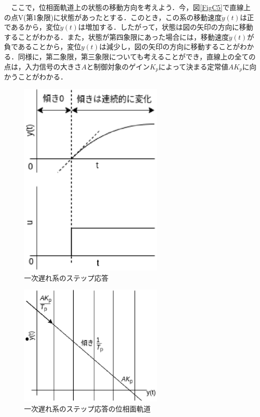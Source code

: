 \documentclass[12pt]{jsarticle}
\begin{document}
　ここで，位相面軌道上の状態の移動方向を考えよう．今，図\ref{FigC5}で直線上の点V(第1象限)に状態があったとする．このとき，この系の移動速度$\dot{y}(t)$は正であるから，変位$\dot{y}(t)$は増加する．したがって，状態は図の矢印の方向に移動することがわかる．また，状態が第四象限にあった場合には，移動速度$\dot{y}(t)$が負であることから，変位$y(t)$は減少し，図の矢印の方向に移動することがわかる．同様に，第二象限，第三象限についても考えることができ，直線上の全ての点は，入力信号の大きさ$A$と制御対象のゲイン$K_p$によって決まる定常値$AK_p$に向かうことがわかる．\\
\begin{figure}[tb]
  \begin{center}
    \includegraphics[clip,width=7.0cm]{../Img/FigC6.eps}
    \caption{一次遅れ系のステップ応答}
    \label{FigC6}
  \end{center}
\end{figure}
\begin{figure}[tb]
  \begin{center}
    \includegraphics[clip,width=7.0cm]{../Img/FigC7.eps}
    \caption{一次遅れ系のステップ応答の位相面軌道}
    \label{FigC7}
  \end{center}
\end{figure}
\end{document}
